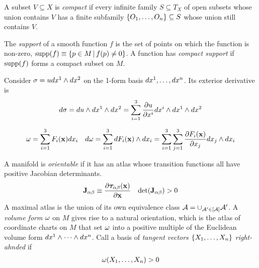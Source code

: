 \documentclass[11pt]{article}
\numberwithin{equation}{section}
\begin{document}
\newpage

\begin{dfn}
A subset $V\subseteq X$ is \textit{compact} if every infinite family $S\subseteq T_X$ of open subsets whose union contains $V$ has a finite subfamily $\{O_1,\ldots,O_n\}\subseteq S$ whose union still contains $V$.
\end{dfn}

\begin{dfn}
The \textit{support} of a smooth function $f$ is the set of points on which the function is non-zero, $\mathrm{supp}(f)\equiv\{p\in M\,|\,f(p)\neq0\}$.
A function has \textit{compact support} if $\mathrm{supp}(f)$ forms a compact subset on $M$.
\end{dfn}


\begin{ex}
Consider $\sigma =u dx^1\wedge dx^2$ on the 1-form basis $dx^1,\ldots,dx^n$. Its exterior derivative is
\begin{align}
  d\sigma 
=
  du
  \wedge
  dx^1
  \wedge
  dx^2
=
  \sum_{i=1}^3
  \frac {\partial u}{\partial x^i}
  dx^i
  \wedge
  dx^1
  \wedge
  dx^2
\end{align}
\end{ex}

\begin{align}
  \omega 
=
  \sum_{i=1}^3
  F_i(\mathbf{x})
  dx_i
&&
  d\omega 
=
  \sum_{i=1}^3
  dF_i(\mathbf{x})
  \wedge
  dx_i
=
  \sum_{i=1}^3
  \sum_{j=1}^3
  \frac {\partial F_i(\mathbf{x})}{\partial x_j}
  dx_j
  \wedge
  dx_i
\end{align}



\begin{rmk}
A manifold is \textit{orientable} if it has an atlas whose transition functions all have positive Jacobian determinants.
\begin{align}
  \bo{J}_{\a\b}
\equiv
  \pd{\bm{\ta}_{\a\b}(\bo{x})}{\bo{x}}
&&
  \mr{det}(\bo{J}_{\a\b})
>
  0
\end{align}
A maximal atlas is the union of its own equivalence class $\mathcal{A}=\cup_{\mathcal{A}'\in[\mathcal{A}]}\mathcal{A}'$.
A \textit{volume form} $\omega $ on $M$ gives rise to a natural orientation, which is the atlas of coordinate charts on $M$ that set $\omega $ into a positive multiple of the Euclidean volume form $dx^1\wedge\cdots\wedge dx^n$.
Call a basis of \textit{tangent vectors} $\{X_1,\ldots,X_n\}$ \textit{right-ahnded} if
\begin{align}
  \omega (X_1,\ldots,X_n)
>
  0
\end{align}
\end{rmk}
\end{document}
